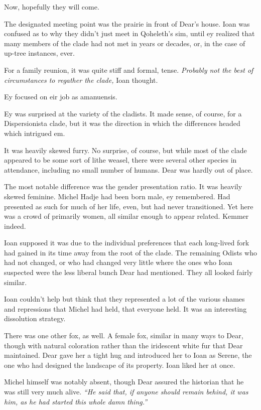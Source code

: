 Now, hopefully they will come.

\secdiv{}

\noindent The designated meeting point was the prairie in front of Dear's house. Ioan was confused as to why they didn't just meet in Qoheleth's sim, until ey realized that many members of the clade had not met in years or decades, or, in the case of up-tree instances, ever.

For a family reunion, it was quite stiff and formal, tense. \emph{Probably not the best of circumstances to regather the clade,} Ioan thought.

Ey focused on eir job as amanuensis.

Ey was surprised at the variety of the cladists. It made sense, of course, for a Dispersionista clade, but it was the direction in which the differences headed which intrigued em.

It was heavily skewed furry. No surprise, of course, but while most of the clade appeared to be some sort of lithe weasel, there were several other species in attendance, including no small number of humans. Dear was hardly out of place.

The most notable difference was the gender presentation ratio. It was heavily skewed feminine. Michel Hadje had been born male, ey remembered. Had presented as such for much of her life, even, but had never transitioned. Yet here was a crowd of primarily women, all similar enough to appear related. Kemmer indeed.

Ioan supposed it was due to the individual preferences that each long-lived fork had gained in its time away from the root of the clade. The remaining Odists who had not changed, or who had changed very little where the ones who Ioan suspected were the less liberal bunch Dear had mentioned. They all looked fairly similar.

Ioan couldn't help but think that they represented a lot of the various shames and repressions that Michel had held, that everyone held. It was an interesting dissolution strategy.

There was one other fox, as well. A female fox, similar in many ways to Dear, though with natural coloration rather than the iridescent white fur that Dear maintained. Dear gave her a tight hug and introduced her to Ioan as Serene, the one who had designed the landscape of its property. Ioan liked her at once.

Michel himself was notably absent, though Dear assured the historian that he was still very much alive. \emph{``He said that, if anyone should remain behind, it was him, as he had started this whole damn thing.''}

